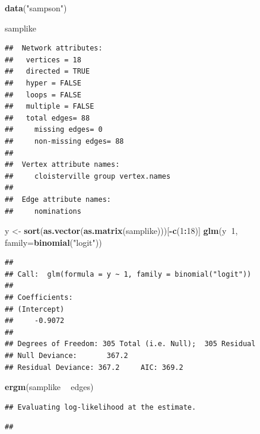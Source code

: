 \documentclass[]{book}
\newenvironment{Shaded}{\begin{snugshade}}{\end{snugshade}}
\newcommand{\KeywordTok}[1]{\textcolor[rgb]{0.13,0.29,0.53}{\textbf{#1}}}
\newcommand{\DataTypeTok}[1]{\textcolor[rgb]{0.13,0.29,0.53}{#1}}
\newcommand{\DecValTok}[1]{\textcolor[rgb]{0.00,0.00,0.81}{#1}}
\newcommand{\StringTok}[1]{\textcolor[rgb]{0.31,0.60,0.02}{#1}}
\newcommand{\OperatorTok}[1]{\textcolor[rgb]{0.81,0.36,0.00}{\textbf{#1}}}
\newcommand{\NormalTok}[1]{#1}
\theoremstyle{definition}
\theoremstyle{definition}
\theoremstyle{definition}
\theoremstyle{remark}
\begin{document}
\begin{Shaded}
\begin{Highlighting}[]
\KeywordTok{data}\NormalTok{(}\StringTok{"sampson"}\NormalTok{)}

\NormalTok{samplike}
\end{Highlighting}
\end{Shaded}

\begin{verbatim}
##  Network attributes:
##   vertices = 18 
##   directed = TRUE 
##   hyper = FALSE 
##   loops = FALSE 
##   multiple = FALSE 
##   total edges= 88 
##     missing edges= 0 
##     non-missing edges= 88 
## 
##  Vertex attribute names: 
##     cloisterville group vertex.names 
## 
##  Edge attribute names: 
##     nominations
\end{verbatim}

\begin{Shaded}
\begin{Highlighting}[]
\NormalTok{y <-}\StringTok{ }\KeywordTok{sort}\NormalTok{(}\KeywordTok{as.vector}\NormalTok{(}\KeywordTok{as.matrix}\NormalTok{(samplike)))[}\OperatorTok{-}\KeywordTok{c}\NormalTok{(}\DecValTok{1}\OperatorTok{:}\DecValTok{18}\NormalTok{)]}
\KeywordTok{glm}\NormalTok{(y}\OperatorTok{~}\DecValTok{1}\NormalTok{, }\DataTypeTok{family=}\KeywordTok{binomial}\NormalTok{(}\StringTok{"logit"}\NormalTok{))}
\end{Highlighting}
\end{Shaded}

\begin{verbatim}
## 
## Call:  glm(formula = y ~ 1, family = binomial("logit"))
## 
## Coefficients:
## (Intercept)  
##     -0.9072  
## 
## Degrees of Freedom: 305 Total (i.e. Null);  305 Residual
## Null Deviance:       367.2 
## Residual Deviance: 367.2     AIC: 369.2
\end{verbatim}

\begin{Shaded}
\begin{Highlighting}[]
\KeywordTok{ergm}\NormalTok{(samplike }\OperatorTok{~}\StringTok{ }\NormalTok{edges)}
\end{Highlighting}
\end{Shaded}

\begin{verbatim}
## Evaluating log-likelihood at the estimate.
\end{verbatim}

\begin{verbatim}
## 
\end{verbatim}
\end{document}
